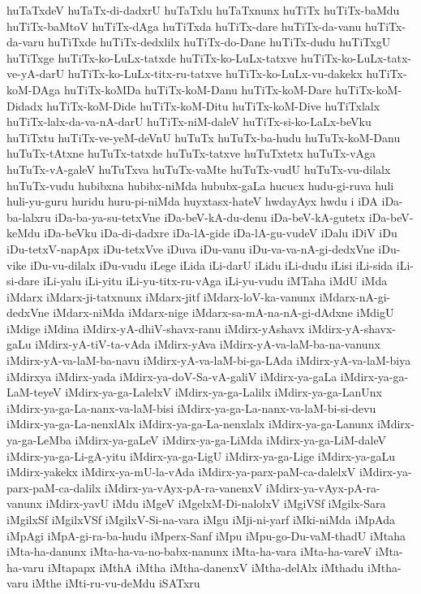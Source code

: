 {huTaTxdeV
huTaTx-di-dadxrU
huTaTxlu
huTaTxnunx
huTiTx
huTiTx-baMdu
huTiTx-baMtoV
huTiTx-dAga
huTiTxda
huTiTx-dare
huTiTx-da-vanu
huTiTx-da-varu
huTiTxde
huTiTx-dedxlilx
huTiTx-do-Dane
huTiTx-dudu
huTiTxgU
huTiTxge
huTiTx-ko-LuLx-tatxde
huTiTx-ko-LuLx-tatxve
huTiTx-ko-LuLx-tatx-ve-yA-darU
huTiTx-ko-LuLx-titx-ru-tatxve
huTiTx-ko-LuLx-vu-dakekx
huTiTx-koM-DAga
huTiTx-koMDa
huTiTx-koM-Danu
huTiTx-koM-Dare
huTiTx-koM-Didadx
huTiTx-koM-Dide
huTiTx-koM-Ditu
huTiTx-koM-Dive
huTiTxlalx
huTiTx-lalx-da-va-nA-darU
huTiTx-niM-daleV
huTiTx-si-ko-LaLx-beVku
huTiTxtu
huTiTx-ve-yeM-deVnU
huTuTx
huTuTx-ba-hudu
huTuTx-koM-Danu
huTuTx-tAtxne
huTuTx-tatxde
huTuTx-tatxve
huTuTxtetx
huTuTx-vAga
huTuTx-vA-galeV
huTuTxva
huTuTx-vaMte
huTuTx-vudU
huTuTx-vu-dilalx
huTuTx-vudu
hubibxna
hubibx-niMda
hububx-gaLa
hucucx
hudu-gi-ruva
huli
huli-yu-guru
huridu
huru-pi-niMda
huyxtasx-hateV
hwdayAyx
hwdu
i
iDA
iDa-ba-lalxru
iDa-ba-ya-su-tetxVne
iDa-beV-kA-du-denu
iDa-beV-kA-gutetx
iDa-beV-keMdu
iDa-beVku
iDa-di-dadxre
iDa-lA-gide
iDa-lA-gu-vudeV
iDalu
iDiV
iDu
iDu-tetxV-napApx
iDu-tetxVve
iDuva
iDu-vanu
iDu-va-va-nA-gi-dedxVne
iDu-vike
iDu-vu-dilalx
iDu-vudu
iLege
iLida
iLi-darU
iLidu
iLi-dudu
iLisi
iLi-sida
iLi-si-dare
iLi-yalu
iLi-yitu
iLi-yu-titx-ru-vAga
iLi-yu-vudu
iMTaha
iMdU
iMda
iMdarx
iMdarx-ji-tatxnunx
iMdarx-jitf
iMdarx-loV-ka-vanunx
iMdarx-nA-gi-dedxVne
iMdarx-niMda
iMdarx-nige
iMdarx-sa-mA-na-nA-gi-dAdxne
iMdigU
iMdige
iMdina
iMdirx-yA-dhiV-shavx-ranu
iMdirx-yAshavx
iMdirx-yA-shavx-gaLu
iMdirx-yA-tiV-ta-vAda
iMdirx-yAva
iMdirx-yA-va-laM-ba-na-vanunx
iMdirx-yA-va-laM-ba-navu
iMdirx-yA-va-laM-bi-ga-LAda
iMdirx-yA-va-laM-biya
iMdirxya
iMdirx-yada
iMdirx-ya-doV-Sa-vA-galiV
iMdirx-ya-gaLa
iMdirx-ya-ga-LaM-teyeV
iMdirx-ya-ga-LalelxV
iMdirx-ya-ga-Lalilx
iMdirx-ya-ga-LanUnx
iMdirx-ya-ga-La-nanx-va-laM-bisi
iMdirx-ya-ga-La-nanx-va-laM-bi-si-devu
iMdirx-ya-ga-La-nenxlAlx
iMdirx-ya-ga-La-nenxlalx
iMdirx-ya-ga-Lanunx
iMdirx-ya-ga-LeMba
iMdirx-ya-gaLeV
iMdirx-ya-ga-LiMda
iMdirx-ya-ga-LiM-daleV
iMdirx-ya-ga-Li-gA-yitu
iMdirx-ya-ga-LigU
iMdirx-ya-ga-Lige
iMdirx-ya-gaLu
iMdirx-yakekx
iMdirx-ya-mU-la-vAda
iMdirx-ya-parx-paM-ca-dalelxV
iMdirx-ya-parx-paM-ca-dalilx
iMdirx-ya-vAyx-pA-ra-vanenxV
iMdirx-ya-vAyx-pA-ra-vanunx
iMdirx-yavU
iMdu
iMgeV
iMgelxM-Di-nalolxV
iMgiVSf
iMgilx-Sara
iMgilxSf
iMgilxVSf
iMgilxV-Si-na-vara
iMgu
iMji-ni-yarf
iMki-niMda
iMpAda
iMpAgi
iMpA-gi-ra-ba-hudu
iMperx-Sanf
iMpu
iMpu-go-Du-vaM-thadU
iMtaha
iMta-ha-danunx
iMta-ha-va-no-babx-nanunx
iMta-ha-vara
iMta-ha-vareV
iMta-ha-varu
iMtapapx
iMthA
iMtha
iMtha-danenxV
iMtha-delAlx
iMthadu
iMtha-varu
iMthe
iMti-ru-vu-deMdu
iSATxru
}

